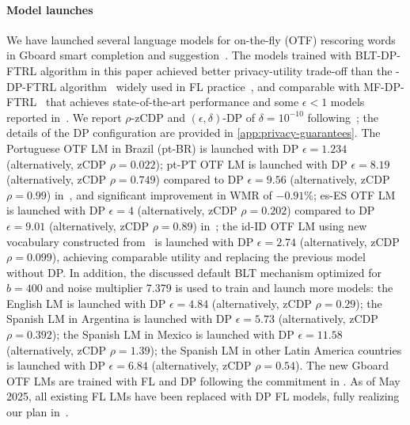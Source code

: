\paragraph{Model launches} We have launched several language models for on-the-fly (OTF) rescoring words in Gboard smart completion and suggestion~\citep{gboard_dp_blogpost,xu2023federated}. The models trained with BLT-DP-FTRL algorithm in this paper achieved better privacy-utility trade-off than the \treeagg-DP-FTRL algorithm~\citep{kairouz21practical} widely used in FL practice~\citep{xu2023federated}, and comparable with MF-DP-FTRL~\citep{choquette2023amplified} that achieves state-of-the-art performance and some $\epsilon<1$ models reported in~\citep{gboard_dp_blogpost}. We report $\rho$-zCDP and $(\epsilon, \delta)$-DP of $\delta=10^{-10}$ following~\citet{xu2023federated,gboard_dp_blogpost}; the details of the DP configuration are provided in \cref{app:privacy-guarantees}. The Portuguese OTF LM in Brazil (pt-BR) is launched with DP $\epsilon=1.234$ (alternatively, zCDP $\rho=0.022$);
pt-PT OTF LM is launched with DP $\epsilon=8.19$ (alternatively, zCDP $\rho=0.749$) compared to DP $\epsilon=9.56$ (alternatively, zCDP $\rho=0.99$) in~\citep{xu2023federated}, and significant improvement in WMR of $-0.91\%$; 
es-ES OTF LM is launched with DP $\epsilon=4$ (alternatively, zCDP $\rho=0.202$) compared to DP $\epsilon=9.01$ (alternatively, zCDP $\rho=0.89$) in~\citep{xu2023federated}; the id-ID OTF LM using new vocabulary constructed from~\citep{gboard_fa_blogpost} is launched with DP $\epsilon=2.74$ (alternatively, zCDP $\rho=0.099$), achieving comparable utility and replacing the previous model without DP. In addition, the discussed default BLT mechanism optimized for $b=400$ and noise multiplier 7.379 is used to train and launch more models: the English LM is launched with DP $\epsilon=4.84$ (alternatively, zCDP $\rho=0.29$); the Spanish LM in Argentina is launched with DP $\epsilon=5.73$ (alternatively, zCDP $\rho=0.392$); the Spanish LM in Mexico is launched with DP $\epsilon=11.58$ (alternatively, zCDP $\rho=1.39$); the Spanish LM in other Latin America countries is launched with  DP $\epsilon=6.84$ (alternatively, zCDP $\rho=0.54$). The new Gboard OTF LMs are trained with FL and DP following the commitment in \citep{gboard_dp_blogpost,zhang2023private}. As of May 2025, all existing FL LMs have been replaced with DP FL models, fully realizing our plan in~\citep{zhang2023private}. 